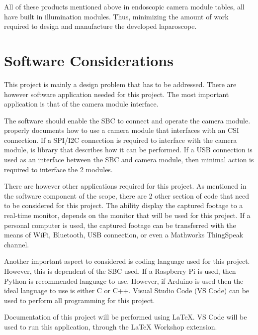 \noindent All of these products mentioned above in endoscopic camera module tables, all have built in illumination modules. Thus, minimizing the amount of work required to design and manufacture the developed laparoscope.


\section{Software Considerations}
\label{sec:Software Considerations}

This project is mainly a design problem that has to be addressed. There are however software application needed for this project. The most important application is that of the camera module interface. 

\vspace{0.5cm}
\noindent The software should enable the SBC to connect and operate the camera module. \citet{RP-DOC} properly documents how to use a camera module that interfaces with an CSI connection. If a SPI/I2C connection is required to interface with the camera module, \citet{GH-AA} is library that describes how it can be performed. If  a USB connection is used as an interface between the SBC and camera module, then minimal action is required to interface the 2 modules. \citep{ML-USB} 

\vspace{0.5cm}
\noindent There are however other applications required for this project. As mentioned in the software component of the scope, there are 2 other section of code that need to be considered for this project. The ability display the captured footage to a real-time monitor, depends on the monitor that will be used for this project. If a personal computer is used, the captured footage can be transferred with the means of WiFi, Bluetooth, USB connection, or even a Mathworks ThingSpeak channel.\citep{MW-TS}

\vspace{0.5cm}
\noindent Another important aspect to considered is coding language used for this project. However, this is dependent of the SBC used. If a Raspberry Pi is used, then Python is recommended language to use. \citep{RP-DOC} However, if Arduino is used then the ideal language to use is either C or C++. \citep{A-DOC} Visual Studio Code (VS Code) can be used to perform all programming for this project.

\vspace{0.5cm}
\noindent Documentation of this project will be performed using LaTeX. VS Code will be used to run this application, through the LaTeX Workshop extension.\citep{VS-LW}


